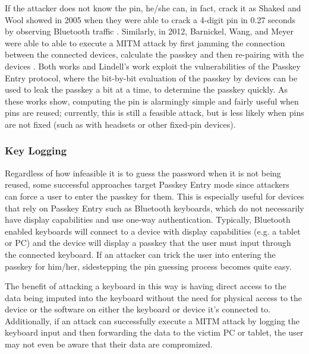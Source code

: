 \documentclass{acm_proc_article-sp}
\begin{document}
If the attacker does not know the pin, he/she can, in fact, crack it as Shaked and Wool showed in 2005 when they were able to crack a 4-digit pin in 0.27 seconds by observing Bluetooth traffic \cite{shaked2005cracking}. Similarly, in 2012, Barnickel, Wang, and Meyer were able to able to execute a MITM attack by first jamming the connection between the connected devices, calculate the passkey and then re-pairing with the devices \cite{barnickel2012implementing}. Both works and Lindell's work exploit the vulnerabilities of the Passkey Entry protocol, where the bit-by-bit evaluation of the passkey by devices can be used to leak the passkey a bit at a time, to determine the passkey quickly. As these works show, computing the pin is alarmingly simple and fairly useful when pins are reused; currently, this is still a feasible attack, but is less likely when pins are not fixed (such as with headsets or other fixed-pin devices).

\subsubsection{Key Logging}
Regardless of how infeasible it is to guess the password when it is not being reused, some successful approaches target Passkey Entry mode since attackers can force a user to enter the passkey for them. This is especially useful for devices that rely on Passkey Entry such as Bluetooth keyboards, which do not necessarily have display capabilities and use one-way authentication. Typically, Bluetooth enabled keyboards will connect to a device with display capabilities (e.g. a tablet or PC) and the device will display a passkey that the user must input through the connected keyboard. If an attacker can trick the user into entering the passkey for him/her, sidestepping the pin guessing process becomes quite easy. 

The benefit of attacking a keyboard in this way is having direct access to the data being imputed into the keyboard without the need for physical access to the device or the software on either the keyboard or device it's connected to. Additionally, if an attack can successfully execute a MITM attack by logging the keyboard input and then forwarding the data to the victim PC or tablet, the user may not even be aware that their data are compromized. 
\end{document}
